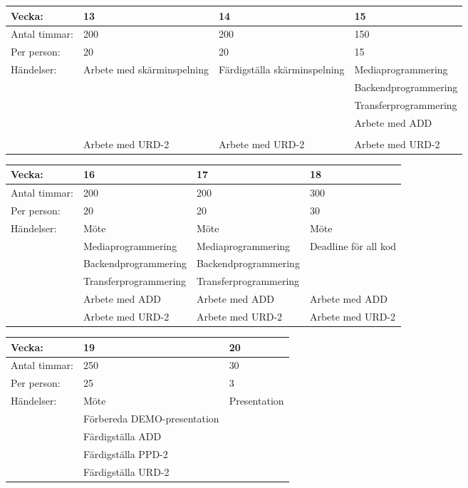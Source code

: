     \begin{tabular}{ | p{65pt} || p{110pt} | p{110pt} | p{110pt} |}
    \hline
    Vecka: & 13 & 14 & 15  \\ \hline
    Antal timmar: & 200 & 200 & 150 \\ \hline
    Per person: & 20 & 20 & 15 \\ \hline
    Händelser: & Arbete med skärminspelning & Färdigställa skärminspelning & Mediaprogrammering \\ \hline
    &  &  & Backendprogrammering \\ \hline
    &  &  & Transferprogrammering \\ \hline
    &  &  & Arbete med ADD \\ \hline
    &  &  &  \\ \hline
    & Arbete med URD-2 & Arbete med URD-2 & Arbete med URD-2\\ \hline
    \end{tabular}

    \begin{tabular}{ | p{65pt} || p{110pt} | p{110pt} | p{110pt} |}
    \hline
    Vecka: & 16 & 17 & 18  \\ \hline
    Antal timmar: & 200 & 200 & 300 \\ \hline
    Per person: & 20 & 20 & 30 \\ \hline
    Händelser: & Möte & Möte & Möte \\ \hline
    & Mediaprogrammering & Mediaprogrammering & Deadline för all kod \\ \hline
    & Backendprogrammering & Backendprogrammering &  \\ \hline
    & Transferprogrammering & Transferprogrammering &  \\ \hline
    & Arbete med ADD & Arbete med ADD & Arbete med ADD \\ \hline
    & Arbete med URD-2 & Arbete med URD-2 & Arbete med URD-2\\ \hline
    \end{tabular}

    \begin{tabular}{ | p{65pt} || p{175pt} | p{168pt} |}
    \hline
    Vecka: & 19 & 20 \\ \hline
    Antal timmar: & 250 & 30 \\ \hline
    Per person: & 25 & 3 \\ \hline
    Händelser: & Möte & Presentation\\ \hline
    & Förbereda DEMO-presentation &\\ \hline
    & Färdigställa ADD &\\ \hline
    & Färdigställa PPD-2 &\\ \hline
    & Färdigställa URD-2 &\\ \hline
    \end{tabular}

